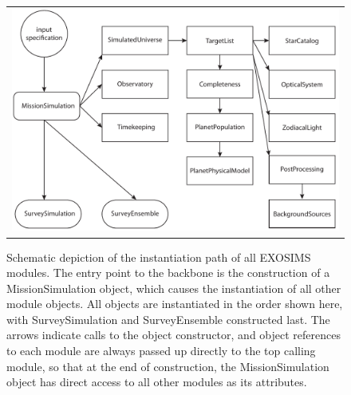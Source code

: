 \documentclass[cleanfoot]{asme2ej}
\begin{document}
\begin{figure}[ht]
    \begin{center}
        \begin{tabular}{c}
             \includegraphics[width=1\textwidth]{instantiation_tree}
        \end{tabular}
    \end{center}
    \caption{Schematic depiction of the instantiation path of all EXOSIMS modules.  The entry point to the backbone is the construction of a MissionSimulation object, which causes the instantiation of all other module objects.  All objects are instantiated in the order shown here, with SurveySimulation and SurveyEnsemble constructed last.  The arrows indicate calls to the object constructor, and object references to each module are always passed up directly to the top calling module, so that at the end of construction, the MissionSimulation object has direct access to all other modules as its attributes.}
    \label{fig:instantiation_tree}
\end{figure}
\end{document}
